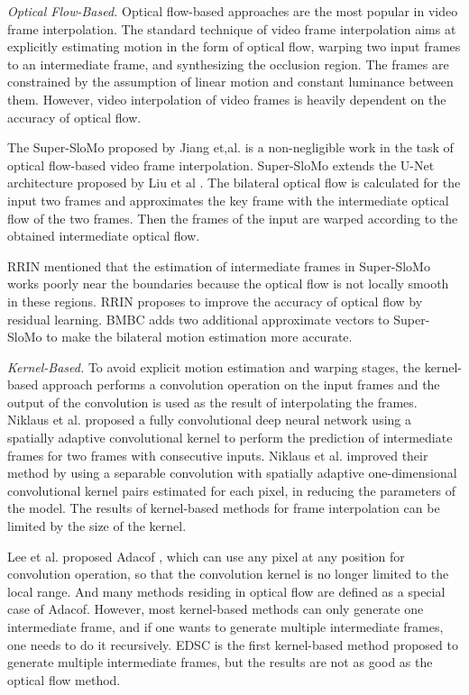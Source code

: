 \documentclass{article}
\begin{document}
\textit{Optical Flow-Based.}
Optical flow-based approaches are the most popular in video frame interpolation.
The standard technique of video frame interpolation aims at explicitly estimating motion in the form of optical flow, warping two input frames to an intermediate frame, and synthesizing the occlusion region. The frames are constrained by the assumption of linear motion and constant luminance between them.
However, video interpolation of video frames is heavily dependent on the accuracy of optical flow.


The Super-SloMo \cite{jiang2018super} proposed by Jiang et,al. is a non-negligible work in the task of optical flow-based video frame interpolation.
Super-SloMo extends the U-Net architecture proposed by Liu et al \cite{liu2017video}.
The bilateral optical flow is calculated for the input two frames and approximates the key frame with the intermediate optical flow of the two frames.
Then the frames of the input are warped according to the obtained intermediate optical flow.

RRIN \cite{li2020video} mentioned that the estimation of intermediate frames in Super-SloMo works poorly near the boundaries because the optical flow is not locally smooth in these regions.
RRIN proposes to improve the accuracy of optical flow by residual learning.
BMBC \cite{park2020bmbc} adds two additional approximate vectors to Super-SloMo to make the bilateral motion estimation more accurate.


\textit{Kernel-Based.}
To avoid explicit motion estimation and warping stages, the kernel-based approach performs a convolution operation on the input frames and the output of the convolution is used as the result of interpolating the frames.
Niklaus et al. \cite{niklaus2017video1} proposed a fully convolutional deep neural network using a spatially adaptive convolutional kernel to perform the prediction of intermediate frames for two frames with consecutive inputs.
Niklaus et al. \cite{niklaus2017video2} improved their method by using a separable convolution with spatially adaptive one-dimensional convolutional kernel pairs estimated for each pixel, in reducing the parameters of the model.
The results of kernel-based methods for frame interpolation can be limited by the size of the kernel.

Lee et al. proposed Adacof \cite{lee2020adacof}, which can use any pixel at any position for convolution operation,
so that the convolution kernel is no longer limited to the local range.
And many methods residing in optical flow are defined as a special case of Adacof.
However, most kernel-based methods can only generate one intermediate frame, and if one wants to generate multiple intermediate frames, one needs to do it recursively.
EDSC \cite{cheng2021multiple} is the first kernel-based method proposed to generate multiple intermediate frames, but the results are not as good as the optical flow method.
\end{document}
